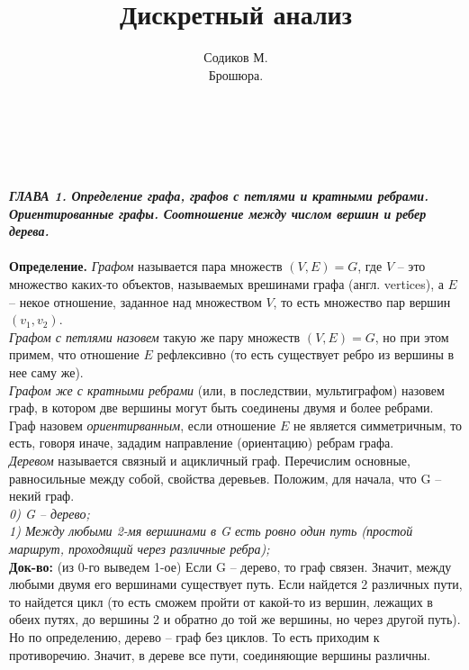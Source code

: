\documentclass[12pt]{article}
\begin{document}
 
\title{Дискретный анализ}
\author{Содиков М.\\
Брошюра.}
\maketitle
\newpage
\\
\textbf{} \\
\\

\textbf{\textit{ГЛАВА 1. Определение графа, графов с петлями и кратными ребрами. Ориентированные графы. Соотношение между числом вершин и ребер дерева.}}
\\
\\

\textbf{Определение.} \textit{Графом} называется пара множеств \(\mathit{(V, E) = G}\), где \(\mathit{V}\) -- это множество каких-то объектов, называемых врешинами графа (англ. vertices), а \(\mathit{E}\) -- некое отношение, заданное над множеством \(\mathit{V}\), то есть множество пар вершин \(\mathit{(v_1, v_2)}\). \\

\textit{Графом с петлями назовем} такую же пару множеств \(\mathit{(V, E) = G}\), но при этом примем, что отношение \(\mathit{E}\) рефлексивно (то есть существует ребро из вершины в нее саму же). \\

\textit{Графом же с кратными ребрами} (или, в последствии, мультиграфом) назовем граф, в котором две вершины могут быть соединены двумя и более ребрами.\\

Граф назовем \textit{ориентирванным}, если отношение \(\mathit{E}\) не является симметричным, то есть, говоря иначе, зададим направление (ориентацию) ребрам графа.\\

\textit{Деревом} называется связный и ацикличный граф. Перечислим основные, равносильные между собой, свойства деревьев. Положим, для начала, что G -- некий граф.\\
\textit{0) G -- дерево;}
\\

\textit{1) Между любыми 2-мя вершинами в G есть ровно один путь (простой маршрут, проходящий через различные ребра);}
\\

\textbf{Док-во:} (из 0-го выведем 1-ое) Если G -- дерево, то граф связен. Значит, между любыми двумя его вершинами существует путь. Если найдется 2 различных пути, то найдется цикл (то есть сможем пройти от какой-то из вершин, лежащих в обеих путях, до вершины 2 и обратно до той же вершины, но через другой путь). Но по определению, дерево -- граф без циклов. То есть приходим к противоречию. Значит, в дереве все пути, соединяющие вершины различны.
\\
\end{document}
